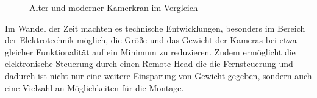 \documentclass[a4paper, 12pt, bibtotocnumbered, liststotocnumbered]{scrartcl}
\begin{document}
	\begin{figure}[htb]
		\centering
		\hfill
		\caption{Alter und moderner Kamerkran im Vergleich}
	\end{figure}

	Im Wandel der Zeit machten es technische Entwicklungen, besonders im Bereich der Elektrotechnik möglich, die Größe und das Gewicht der Kameras bei etwa gleicher Funktionalität auf ein Minimum zu reduzieren. Zudem ermöglicht die elektronische Steuerung  durch einen Remote-Head die die Fernsteuerung und dadurch ist nicht nur eine weitere Einsparung von Gewicht gegeben, sondern auch eine Vielzahl an Möglichkeiten für die Montage.
\end{document}
